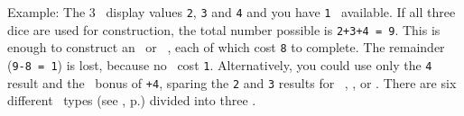 Example: The 3 \whitedice\ display values \texttt{2}, \texttt{3} and \texttt{4} and you have \texttt{1} \greatperson\ available.  If all three dice are used for construction, the total number possible is \texttt{2+3+4 = 9}.  This is enough to construct an \academy\ or \factory\ \fortification, each of which cost \texttt{8} to complete.  The remainder (\texttt{9-8 = 1}) is lost, because no \fortifications\ cost \texttt{1}.  Alternatively, you could use only the \texttt{4} result and the \greatperson\ bonus of \texttt{+4}, sparing the \texttt{2} and \texttt{3} results for \activating\ \fortifications, \trade, or \culture.
\newline\newline
There are six different \fortification\ types (see , p.\pageref{sec:fortifications}) divided into three \levels.
